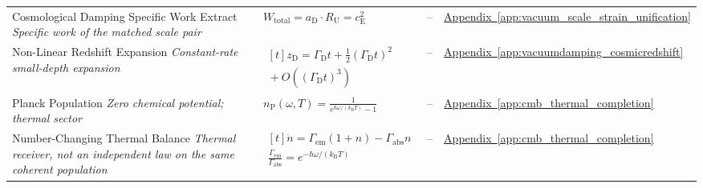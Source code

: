 \begin{longtable}{@{} p{4.5cm} p{6cm} c p{4cm} @{}}
{\raggedright Cosmological Damping Specific Work Extract \newline \textit{Specific work of the matched scale pair}\par} & {\raggedright $W_{\mathrm{total}} = a_{\mathrm{D}} \cdot R_{\mathrm{U}} = c_{\mathrm{E}}^2$\par} & -- & {\raggedright \hyperref[app:vacuum_scale_strain_unification]{Appendix~\ref*{app:vacuum_scale_strain_unification}}\par} \\

{\raggedright Non-Linear Redshift Expansion \newline \textit{Constant-rate small-depth expansion}\par} & {\raggedright $\begin{gathered}[t]z_{\mathrm D}=\Gamma_{\mathrm D}t+\tfrac12(\Gamma_{\mathrm D}t)^2 \\ {}+O((\Gamma_{\mathrm D}t)^3)\end{gathered}$\par} & -- & {\raggedright \hyperref[app:vacuumdamping_cosmicredshift]{Appendix~\ref*{app:vacuumdamping_cosmicredshift}}\par} \\

{\raggedright Planck Population \newline \textit{Zero chemical potential; thermal sector}\par} & {\raggedright $n_{\mathrm P}(\omega,T)=\frac1{e^{\hbar\omega/(k_{\mathrm B}T)}-1}$\par} & -- & {\raggedright \hyperref[app:cmb_thermal_completion]{Appendix~\ref*{app:cmb_thermal_completion}}\par} \\

{\raggedright Number-Changing Thermal Balance \newline \textit{Thermal receiver, not an independent law on the same coherent population}\par} & {\raggedright $\begin{gathered}[t]\dot n=\Gamma_{\mathrm{em}}(1+n)-\Gamma_{\mathrm{abs}}n \\ \frac{\Gamma_{\mathrm{em}}}{\Gamma_{\mathrm{abs}}}=e^{-\hbar\omega/(k_{\mathrm B}T)}\end{gathered}$\par} & -- & {\raggedright \hyperref[app:cmb_thermal_completion]{Appendix~\ref*{app:cmb_thermal_completion}}\par} \\


\end{longtable}
